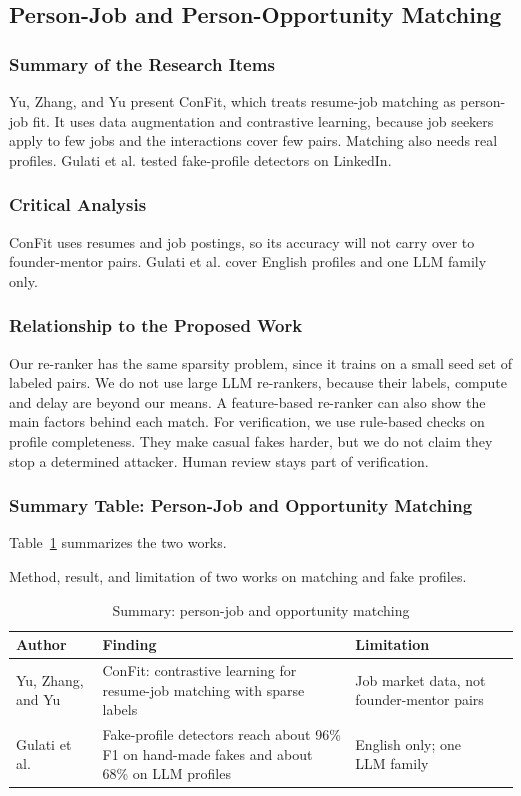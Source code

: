 \documentclass{FastFyp}
\makeatletter
\newcommand{\capdesc}[1]{%
  \par\nobreak
  \begingroup
  \setstretch{1}%
  \ifdefstring{\@captype}{figure}%
    {\vspace{0.2\baselineskip}}%
    {\vspace{-0.8\baselineskip}}%
  {\centering\normalfont\itshape\small
   \begin{minipage}{0.92\textwidth}\centering #1\end{minipage}\par}%
  \endgroup
  \vspace{0.4\baselineskip}%
}
\makeatother
\begin{document}
\subsection{Person-Job and Person-Opportunity Matching}

\subsubsection{Summary of the Research Items}
Yu, Zhang, and Yu \cite{ref:yu2024confit} present ConFit, which treats resume-job matching as person-job fit. It uses data augmentation and contrastive learning, because job seekers apply to few jobs and the interactions cover few pairs. Matching also needs real profiles. Gulati et al. \cite{ref:gulati2025} tested fake-profile detectors on LinkedIn.

\subsubsection{Critical Analysis}
ConFit uses resumes and job postings, so its accuracy will not carry over to founder-mentor pairs. Gulati et al. cover English profiles and one LLM family only.

\subsubsection{Relationship to the Proposed Work}
Our re-ranker has the same sparsity problem, since it trains on a small seed set of labeled pairs. We do not use large LLM re-rankers, because their labels, compute and delay are beyond our means. A feature-based re-ranker can also show the main factors behind each match. For verification, we use rule-based checks on profile completeness. They make casual fakes harder, but we do not claim they stop a determined attacker. Human review stays part of verification.

\subsubsection{Summary Table: Person-Job and Opportunity Matching}
Table~\ref{tab:lr-matching} summarizes the two works.
\begin{table}[!ht]
\centering
\caption{Summary: person-job and opportunity matching}
\capdesc{Method, result, and limitation of two works on matching and fake profiles.}
\begin{tabular}{|p{3.0cm}|p{4.0cm}|p{2.8cm}|p{4.0cm}|}
\hline
\textbf{Author} & \textbf{Finding} & \textbf{Limitation} \\
\hline
Yu, Zhang, and Yu \cite{ref:yu2024confit} & ConFit: contrastive learning for resume-job matching with sparse labels & Job market data, not founder-mentor pairs \\
\hline
Gulati et al. \cite{ref:gulati2025} & Fake-profile detectors reach about 96\% F1 on hand-made fakes and about 68\% on LLM profiles & English only; one LLM family \\
\hline
\end{tabular}
\label{tab:lr-matching}
\end{table}
\end{document}
